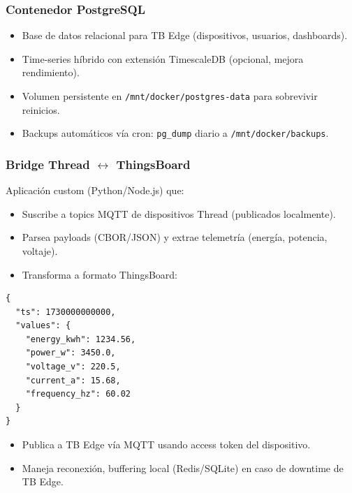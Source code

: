 \subsubsection{Contenedor PostgreSQL}

\begin{itemize}
    \item Base de datos relacional para TB Edge (dispositivos, usuarios, dashboards).
    \item Time-series híbrido con extensión TimescaleDB (opcional, mejora rendimiento).
    \item Volumen persistente en \texttt{/mnt/docker/postgres-data} para sobrevivir reinicios.
    \item Backups automáticos vía cron: \texttt{pg\_dump} diario a \texttt{/mnt/docker/backups}.
\end{itemize}

\subsubsection{Bridge Thread $\leftrightarrow$ ThingsBoard}

Aplicación custom (Python/Node.js) que:
\begin{itemize}
    \item Suscribe a topics MQTT de dispositivos Thread (publicados localmente).
    \item Parsea payloads (CBOR/JSON) y extrae telemetría (energía, potencia, voltaje).
    \item Transforma a formato ThingsBoard:
\end{itemize}

\begin{verbatim}
{
  "ts": 1730000000000,
  "values": {
    "energy_kwh": 1234.56,
    "power_w": 3450.0,
    "voltage_v": 220.5,
    "current_a": 15.68,
    "frequency_hz": 60.02
  }
}
\end{verbatim}

\begin{itemize}
    \item Publica a TB Edge vía MQTT usando access token del dispositivo.
    \item Maneja reconexión, buffering local (Redis/SQLite) en caso de downtime de TB Edge.
\end{itemize}

